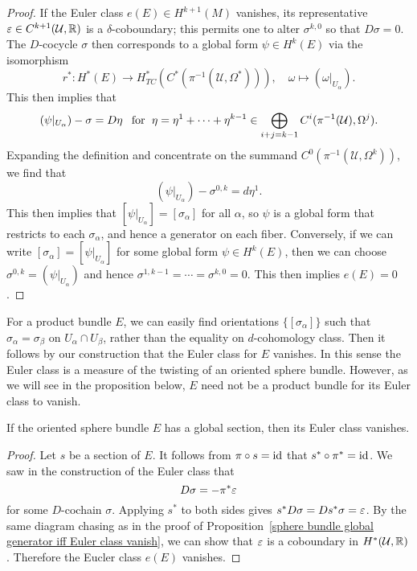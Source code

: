 \begin{proof}
If the Euler class $e(E)\in H^{k+1}(M)$ vanishes, its representative $\varepsilon\in C^{k+1}(\mathcal{U},\mathbb{R})$ is a $\delta$-coboundary; this permits one to alter 
$\sigma^{k,0}$ so that $D\sigma=0$. The $D$-cocycle $\sigma$ then corresponds to a global form $\psi\in H^{k}(E)$ via the isomorphism 
\[r^*:H^*(E)\to H^*_{TC}(C^*(\pi^{-1}(\mathcal{U},\Omega^*))),\quad \omega\mapsto(\omega|_{U_\alpha}).\]
This then implies that
\[(\psi|_{U_\alpha})-\sigma=D\eta\hspace{8pt}\text{for}\hspace{6pt} \eta=\eta^1+\cdots+\eta^{k-1}\in\bigoplus_{i+j=k-1}C^i(\pi^{-1}(\mathcal{U}),\Omega^j).\]
Expanding the definition and concentrate on the summand $C^0(\pi^{-1}(\mathcal{U},\Omega^k))$, we find that
\[(\psi|_{U_\alpha})-\sigma^{0,k}=d\eta^1.\]
This then implies that $[\psi|_{U_\alpha}]=[\sigma_\alpha]$ for all $\alpha$, so $\psi$ is a global form that restricts to each $\sigma_\alpha$, and hence a generator on 
each fiber. Conversely, if we can write $[\sigma_\alpha]=[\psi|_{U_\alpha}]$ for some global form $\psi\in H^k(E)$, then we can choose $\sigma^{0,k}=(\psi|_{U_\alpha})$ and 
hence $\sigma^{1,k-1}=\cdots=\sigma^{k,0}=0$. This then implies $e(E)=0$.
\end{proof}
For a product bundle $E$, we can easily find orientations $\{[\sigma_\alpha]\}$ such that $\sigma_\alpha=\sigma_\beta$ on $U_\alpha\cap U_\beta$, rather than the equality 
on $d$-cohomology class. Then it follows by our construction that the Euler class for $E$ vanishes. In this sense the Euler class is a measure of the twisting of an oriented sphere 
bundle. However, as we will see in the proposition below, $E$ need not be a product bundle for its Euler class to vanish.
\begin{proposition}
If the oriented sphere bundle $E$ has a global section, then its Euler class vanishes.
\end{proposition}
\begin{proof}
Let $s$ be a section of $E$. It follows from $\pi\circ s=\mathrm{id}$ that $s^*\circ\pi^*=\mathrm{id}$. We saw in the construction of the Euler class that 
\[D\sigma=-\pi^*\varepsilon\]
for some $D$-cochain $\sigma$. Applying $s^*$ to both sides gives $s^*D\sigma=Ds^*\sigma=\varepsilon$. By the same diagram chasing as in the proof of 
Proposition~\ref{sphere bundle global generator iff Euler class vanish}, we can show that $\varepsilon$ is a coboundary in $H^*(\mathcal{U},\mathbb{R})$. Therefore the Eucler class 
$e(E)$ vanishes.
\end{proof}
